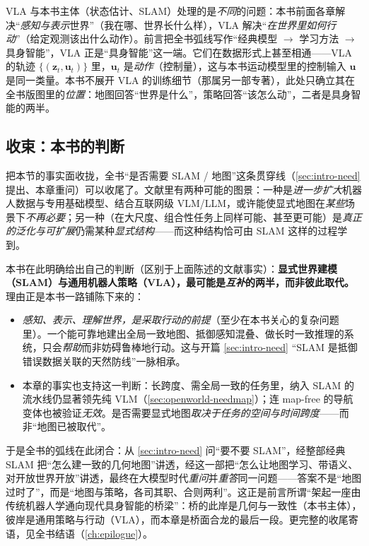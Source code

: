\begin{note}
VLA 与本书主体（状态估计、SLAM）处理的是\emph{不同}的问题：本书前面各章解决“\emph{感知与表示}世界”（我在哪、世界长什么样），VLA 解决“\emph{在世界里如何行动}”（给定观测该出什么动作）。前言把全书弧线写作“经典模型 $\to$ 学习方法 $\to$ 具身智能”，VLA 正是“具身智能”这一端。它们在数据形式上甚至相通——VLA 的轨迹 $\{(\mathbf{z}_t,\mathbf{u}_t)\}$ 里，$\mathbf{u}_t$ 是\emph{动作}（控制量），这与本书运动模型里的控制输入 $\mathbf{u}$ 是同一类量。本书不展开 VLA 的训练细节（那属另一部专著），此处只确立其在全书版图里的\emph{位置}：地图回答“世界是什么”，策略回答“该怎么动”，二者是具身智能的两半。
\end{note}

\subsection{收束：本书的判断}
\label{sec:openworld-closing}

把本节的事实面收拢，全书“是否需要 SLAM / 地图”这条贯穿线（\cref{sec:intro-need} 提出、本章重问）可以收尾了。文献里有两种可能的图景\cite{paull2026openworld}：一种是\emph{进一步扩大}机器人数据与专用基础模型、结合互联网级 VLM/LLM，或许能使显式地图在\emph{某些}场景下\emph{不再必要}；另一种（在大尺度、组合性任务上同样可能、甚至更可能）是\emph{真正的泛化与可扩展}仍需某种\emph{显式结构}——而这种结构恰可由 SLAM 这样的过程学到。

\begin{insight}
本书在此明确给出自己的判断（区别于上面陈述的文献事实）：\textbf{显式世界建模（SLAM）与通用机器人策略（VLA），最可能是\emph{互补}的两半，而非彼此取代。}理由正是本书一路铺陈下来的：
\begin{itemize}
  \item \emph{感知、表示、理解世界，是采取行动的前提}（至少在本书关心的复杂问题里）。一个能可靠地建出全局一致地图、抵御感知混叠、做长时一致推理的系统，只会\emph{帮助}而非妨碍鲁棒地行动。这与开篇 \cref{sec:intro-need} “SLAM 是抵御错误数据关联的天然防线”一脉相承。
  \item 本章的事实也支持这一判断：长跨度、需全局一致的任务里，纳入 SLAM 的流水线仍显著领先纯 VLM（\cref{sec:openworld-needmap}）；连 map-free 的导航变体也被验证\emph{无效}。是否需要显式地图\emph{取决于任务的空间与时间跨度}——而非“地图已被取代”。
\end{itemize}
\noindent 于是全书的弧线在此闭合：从 \cref{sec:intro-need} 问“要不要 SLAM”，经整部经典 SLAM 把“怎么建一致的几何地图”讲透，经这一部把“怎么让地图学习、带语义、对开放世界开放”讲透，最终在大模型时代\emph{重问}并\emph{重答}同一问题——答案不是“地图过时了”，而是“地图与策略，各司其职、合则两利”。这正是前言所谓“架起一座由传统机器人学通向现代具身智能的桥梁”：桥的此岸是几何与一致性（本书主体），彼岸是通用策略与行动（VLA），而本章是桥面合龙的最后一段。更完整的收尾寄语，见全书结语（\cref{ch:epilogue}）。
\end{insight}

